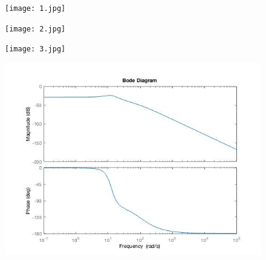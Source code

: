 \documentclass{article}
\begin{document}
\begin{figure}
\texttt{[image: 1.jpg]}
\end{figure}
\newpage
\begin{figure}
\texttt{[image: 2.jpg]}
\end{figure}
\newpage
\begin{figure}
\texttt{[image: 3.jpg]}
\end{figure}
\newpage
\begin{figure}
\includegraphics[scale=0.5]{4.jpg}
\end{figure}
\end{document}
